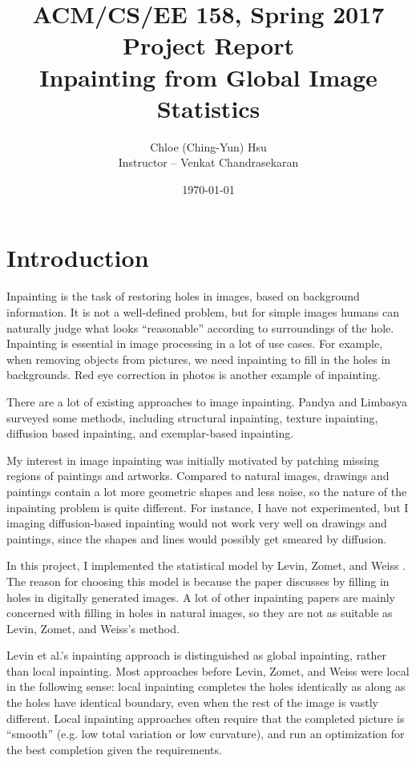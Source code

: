 \documentclass[11pt,letterpaper]{article}
\title{ACM/CS/EE 158, Spring 2017 \\ Project Report \\ Inpainting from Global Image Statistics}
\author{Chloe (Ching-Yun) Hsu \\ Instructor -- Venkat Chandrasekaran}
\date{\today}
\begin{document}
\maketitle

\section{Introduction}

Inpainting is the task of restoring holes in images, based on background information. It is not a well-defined problem, but for simple images humans can naturally judge what looks ``reasonable'' according to surroundings of the hole. Inpainting is essential in image processing in a lot of use cases. For example, when removing objects from pictures, we need inpainting to fill in the holes in backgrounds. Red eye correction in photos is another example of inpainting.

There are a lot of existing approaches to image inpainting. Pandya and Limbasya \cite{pandya2013survey} surveyed some methods, including structural inpainting, texture inpainting, diffusion based inpainting, and exemplar-based inpainting. 

My interest in image inpainting was initially motivated by patching missing regions of paintings and artworks. Compared to natural images, drawings and paintings contain a lot more geometric shapes and less noise, so the nature of the inpainting problem is quite different. For instance, I have not experimented, but I imaging diffusion-based inpainting would not work very well on drawings and paintings, since the shapes and lines would possibly get smeared by diffusion.

In this project, I implemented the statistical model by Levin, Zomet, and Weiss \cite{levin2003learning}. The reason for choosing this model is because the paper discusses by filling in holes in digitally generated images. A lot of other inpainting papers are mainly concerned with filling in holes in natural images, so they are not as suitable as Levin, Zomet, and Weiss's method. 

Levin et al.'s inpainting approach is distinguished as global inpainting, rather than local inpainting. Most approaches before Levin, Zomet, and Weiss were local in the following sense: local inpainting completes the holes identically as along as the holes have identical boundary, even when the rest of the image is vastly different. Local inpainting approaches often require that the completed picture is ``smooth'' (e.g. low total variation or low curvature), and run an optimization for the best completion given the requirements. 
\end{document}
